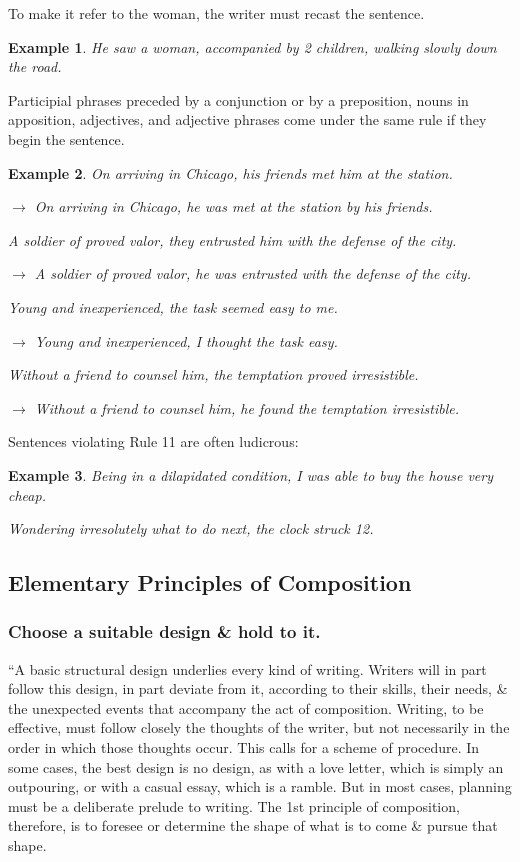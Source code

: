 \documentclass{article}
\newtheorem{example}{Example}
\begin{document}
To make it refer to the woman, the writer must recast the sentence.
\begin{example}
	He saw a woman, accompanied by 2 children, walking slowly down the road.
\end{example}
Participial phrases preceded by a conjunction or by a preposition, nouns in apposition, adjectives, and adjective phrases come under the same rule if they begin the sentence.
\begin{example}
	On arriving in Chicago, his friends met him at the station.
	
	$\to$ On arriving in Chicago, he was met at the station by his friends.
	
	A soldier of proved valor, they entrusted him with the defense of the city.
	
	$\to$ A soldier of proved valor, he was entrusted with the defense of the city.
	
	Young and inexperienced, the task seemed easy to me.
	
	$\to$ Young and inexperienced, I thought the task easy.
	
	Without a friend to counsel him, the temptation proved irresistible.
	
	$\to$ Without a friend to counsel him, he found the temptation irresistible.
\end{example}
Sentences violating Rule 11 are often ludicrous:
\begin{example}
	Being in a dilapidated condition, I was able to buy the house very cheap.
	
	Wondering irresolutely what to do next, the clock struck 12.
\end{example}


\subsection{Elementary Principles of Composition}

\subsubsection{Choose a suitable design \& hold to it.}
``A basic structural design underlies every kind of writing. Writers will in part follow this design, in part deviate from it, according to their skills, their needs, \& the unexpected events that accompany the act of composition. Writing, to be effective, must follow closely the thoughts of the writer, but not necessarily in the order in which those thoughts occur. This calls for a scheme of procedure. In some cases, the best design is no design, as with a love letter, which is simply an outpouring, or with a casual essay, which is a ramble. But in most cases, planning must be a deliberate prelude to writing. The 1st principle of composition, therefore, is to foresee or determine the shape of what is to come \& pursue that shape.
\end{document}
